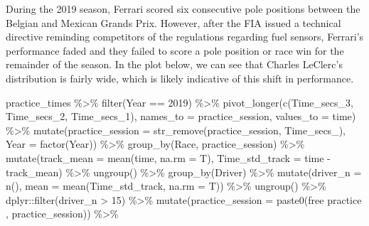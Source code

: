 \documentclass[
]{book}
\newenvironment{Shaded}{\begin{snugshade}}{\end{snugshade}}
\newcommand{\AttributeTok}[1]{\textcolor[rgb]{0.77,0.63,0.00}{#1}}
\newcommand{\DecValTok}[1]{\textcolor[rgb]{0.00,0.00,0.81}{#1}}
\newcommand{\FunctionTok}[1]{\textcolor[rgb]{0.00,0.00,0.00}{#1}}
\newcommand{\NormalTok}[1]{#1}
\newcommand{\SpecialCharTok}[1]{\textcolor[rgb]{0.00,0.00,0.00}{#1}}
\newcommand{\StringTok}[1]{\textcolor[rgb]{0.31,0.60,0.02}{#1}}
\begin{document}
During the 2019 season, Ferrari scored six consecutive pole positions between the Belgian and Mexican Grands Prix. However, after the FIA issued a technical directive reminding competitors of the regulations regarding fuel sensors, Ferrari's performance faded and they failed to score a pole position or race win for the remainder of the season. In the plot below, we can see that Charles LeClerc's distribution is fairly wide, which is likely indicative of this shift in performance.

\begin{Shaded}
\begin{Highlighting}[]
\NormalTok{practice\_times }\SpecialCharTok{\%\textgreater{}\%}
  \FunctionTok{filter}\NormalTok{(Year }\SpecialCharTok{==} \DecValTok{2019}\NormalTok{) }\SpecialCharTok{\%\textgreater{}\%} 
  \FunctionTok{pivot\_longer}\NormalTok{(}\FunctionTok{c}\NormalTok{(Time\_secs\_3, Time\_secs\_2, Time\_secs\_1), }\AttributeTok{names\_to =} \StringTok{\textquotesingle{}practice\_session\textquotesingle{}}\NormalTok{, }\AttributeTok{values\_to =} \StringTok{\textquotesingle{}time\textquotesingle{}}\NormalTok{) }\SpecialCharTok{\%\textgreater{}\%}
  \FunctionTok{mutate}\NormalTok{(}\AttributeTok{practice\_session =} \FunctionTok{str\_remove}\NormalTok{(practice\_session, }\StringTok{\textquotesingle{}Time\_secs\_\textquotesingle{}}\NormalTok{),}
         \AttributeTok{Year =} \FunctionTok{factor}\NormalTok{(Year)) }\SpecialCharTok{\%\textgreater{}\%}
   \FunctionTok{group\_by}\NormalTok{(Race, practice\_session) }\SpecialCharTok{\%\textgreater{}\%}
   \FunctionTok{mutate}\NormalTok{(}\AttributeTok{track\_mean =} \FunctionTok{mean}\NormalTok{(time, }\AttributeTok{na.rm =}\NormalTok{ T),}
          \AttributeTok{Time\_std\_track =}\NormalTok{ time }\SpecialCharTok{{-}}\NormalTok{ track\_mean) }\SpecialCharTok{\%\textgreater{}\%} 
   \FunctionTok{ungroup}\NormalTok{() }\SpecialCharTok{\%\textgreater{}\%} 
   \FunctionTok{group\_by}\NormalTok{(Driver) }\SpecialCharTok{\%\textgreater{}\%} 
   \FunctionTok{mutate}\NormalTok{(}\AttributeTok{driver\_n =} \FunctionTok{n}\NormalTok{(),}
          \AttributeTok{mean =} \FunctionTok{mean}\NormalTok{(Time\_std\_track, }\AttributeTok{na.rm =}\NormalTok{ T)) }\SpecialCharTok{\%\textgreater{}\%}
   \FunctionTok{ungroup}\NormalTok{() }\SpecialCharTok{\%\textgreater{}\%}
\NormalTok{   dplyr}\SpecialCharTok{::}\FunctionTok{filter}\NormalTok{(driver\_n }\SpecialCharTok{\textgreater{}} \DecValTok{15}\NormalTok{) }\SpecialCharTok{\%\textgreater{}\%} 
  \FunctionTok{mutate}\NormalTok{(}\AttributeTok{practice\_session =} \FunctionTok{paste0}\NormalTok{(}\StringTok{\textquotesingle{}free practice \textquotesingle{}}\NormalTok{, practice\_session)) }\SpecialCharTok{\%\textgreater{}\%}  

\end{Highlighting}
\end{Shaded}
\end{document}
